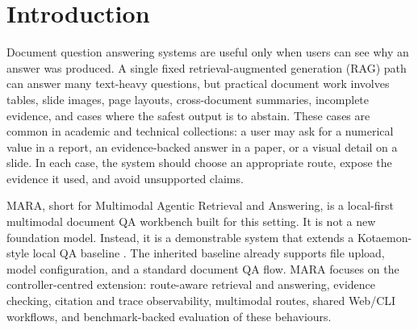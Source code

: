 \begin{abstract}
MARA is a local-first workbench for document question answering over mixed technical and academic collections. It extends a basic local QA framework, inherited from Kotaemon, with a route-aware controller, shared Web and CLI workflows, multimodal evidence routes, citation and trace observability, and a benchmark harness for route-level diagnosis. The main technical feature is a Self-RAG-inspired controller implemented as explicit program decisions rather than as a trained reflection-token model. Given a question and selected sources, the controller inspects text, visual, element, and graph evidence availability; starts from fixed, planner-supplied, or heuristic route decisions; applies heuristic route-scoring proxies when probe evidence is available; selects among text RAG, page-image/VLM, hybrid, guarded retrieval, graph, direct, and abstention behaviours; and returns answer, citation, evidence, workflow-cost, and verification traces. A full-system benchmark over 41 completed artifact sets and 3,540 prediction records shows that MARA's controller behaviour is measurable across text-heavy, citation-grounded, and multimodal QA settings. The paper presents the approach, experiments and results, demonstration use case, related work, and the engineering limitations that remain before broader deployment.
\end{abstract}

\section{Introduction}

Document question answering systems are useful only when users can see why an answer was produced. A single fixed retrieval-augmented generation (RAG) path can answer many text-heavy questions, but practical document work involves tables, slide images, page layouts, cross-document summaries, incomplete evidence, and cases where the safest output is to abstain. These cases are common in academic and technical collections: a user may ask for a numerical value in a report, an evidence-backed answer in a paper, or a visual detail on a slide. In each case, the system should choose an appropriate route, expose the evidence it used, and avoid unsupported claims.

MARA, short for Multimodal Agentic Retrieval and Answering, is a local-first multimodal document QA workbench built for this setting. It is not a new foundation model. Instead, it is a demonstrable system that extends a Kotaemon-style local QA baseline \citep{kotaemon}. The inherited baseline already supports file upload, model configuration, and a standard document QA flow. MARA focuses on the controller-centred extension: route-aware retrieval and answering, evidence checking, citation and trace observability, multimodal routes, shared Web/CLI workflows, and benchmark-backed evaluation of these behaviours.

